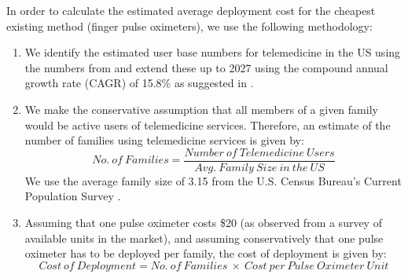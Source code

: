 In order to calculate the estimated average deployment cost for the cheapest existing method (finger pulse oximeters), we use the following methodology:
\begin{enumerate}
    \item We identify the estimated user base numbers for telemedicine in the US using the numbers from \cite{kats_us_2020} and extend these up to 2027 using the compound annual growth rate (CAGR) of 15.8\% as suggested in \cite{polaris_us_2020}.
    
    \item We make the conservative assumption that all members of a given family would be active users of telemedicine services. Therefore, an estimate of the number of families using telemedicine services is given by: 
    \begin{equation}
        No.~of~Families = \frac{Number~of~Telemedicine~Users}{Avg.~Family~Size~in~the~US}
    \end{equation}
    We use the average family size of 3.15 from the U.S. Census Bureau's Current Population Survey \cite{cps_us_2020}.
    
    \item Assuming that one pulse oximeter costs \$20 (as observed from a survey of available units in the market), and assuming conservatively that one pulse oximeter has to be deployed per family, the cost of deployment is given by: 
    \begin{equation}
        Cost~of~Deployment = No.~of~Families~\times~Cost~per~Pulse~Oximeter~Unit
    \end{equation}
\end{enumerate}





